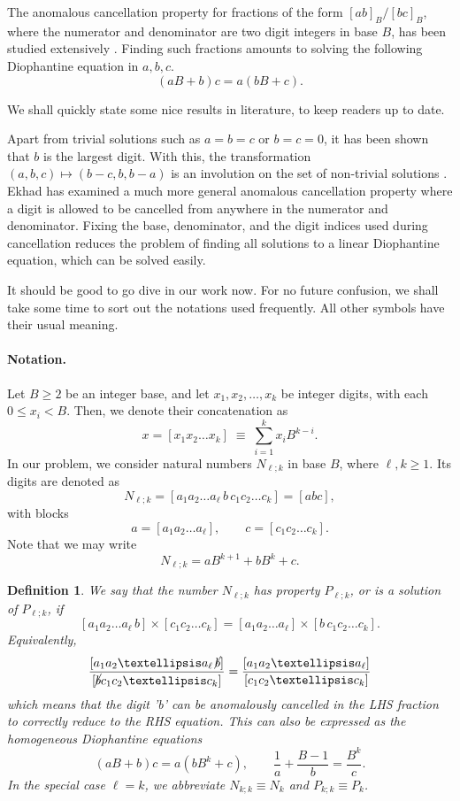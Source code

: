 \documentclass[sn-mathphys]{sn-jnl}%
\theoremstyle{thmstyleone}%
\theoremstyle{thmstyletwo}%
\theoremstyle{thmstylethree}%
\newtheorem{definition}{Definition}%
\begin{document}
The anomalous cancellation property for fractions of the form $[ab]_B / [bc]_B$, where
the numerator and denominator are two digit integers in base $B$, has been studied
extensively \cite{boas}. Finding such fractions amounts to solving the following
Diophantine equation in $a, b, c$. \[
    (aB + b)c = a(bB + c).
\] 

We shall quickly state some nice results in literature, to keep readers up to date.

Apart from trivial solutions such as $a = b = c$ or $b = c = 0$, it has been shown
that $b$ is the largest digit. With this, the transformation $(a, b, c) \mapsto 
(b - c, b, b - a)$ is an involution on the set of non-trivial solutions \cite{yt}.
Ekhad \cite{ekh} has examined a much more general anomalous cancellation property
where a digit is allowed to be cancelled from anywhere in the numerator and 
denominator. Fixing the base, denominator, and the digit indices used during 
cancellation reduces the problem of finding all solutions to a linear Diophantine
equation, which can be solved easily.

It should be good to go dive in our work now. For no future confusion, we shall take some time to sort out the notations used frequently. All other symbols have their usual meaning.



\paragraph{Notation.} Let $B \geq 2$ be an integer base, and let $x_1, x_2, \dots, x_k$ be
integer digits, with each $0 \leq x_i < B$. Then, we denote their concatenation
as \[
    x = [x_1x_2\dots x_k] \;\equiv\; \sum_{i = 1}^k x_i B^{k - i}.
\] In our problem, we consider natural numbers $N_{\ell; k}$ in base $B$, 
where $\ell, k \geq 1$. Its digits are denoted as \[
    N_{\ell; k} = [a_1a_2\dots a_\ell \,b\, c_1c_2\dots c_k] = [a b c],
\] with blocks \[
    a = [a_1a_2\dots a_\ell], \qquad
    c = [c_1c_2\dots c_k].
\] Note that we may write \[
    N_{\ell; k} = aB^{k + 1} + bB^k + c.
\]

\begin{definition}
    We say that the number $N_{\ell; k}$ has property $P_{\ell; k}$,
    or is a solution of $P_{\ell; k}$, if \[
        [a_1a_2 \dots a_\ell\, b] \times [c_1c_2 \dots c_k] =
        [a_1a_2 \dots a_\ell] \times [b\, c_1c_2 \dots c_k].
    \] Equivalently, \[
        \frac{[a_1a_2\dots a_\ell\, \cancel{b}]}{
        [\cancel{b}c_1c_2\dots c_k]} = \frac{[a_1a_2\dots a_\ell]}{
        [c_1c_2\dots c_k]}
    \] which means that the digit 'b' can be anomalously cancelled in the LHS fraction to \emph{correctly} reduce to the RHS equation. This can also be expressed as the homogeneous Diophantine equations \[
        (aB + b)c = a(bB^k + c), \qquad \frac{1}{a} + \frac{B - 1}{b} = \frac{B^k}{c}.
    \] In the special case $\ell = k$, we abbreviate $N_{k; k} \equiv N_k$ and 
    $P_{k; k} \equiv P_k$.
\end{definition}
\end{document}
